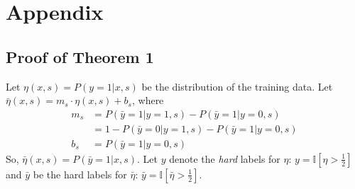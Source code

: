 
\section{Appendix}
\subsection{Proof of Theorem 1}
Let $\eta(x,s)=P(y=1|x,s)$ be the distribution of the training data.
Let $\bar{\eta}(x, s)=m_s\cdot\eta(x,s)+b_s$, where
\begin{align}
  m_s&=P(\bar{y}=1|y=1,s)-P(\bar{y}=1|y=0,s)\nonumber\\
  &=1-P(\bar{y}=0|y=1,s)-P(\bar{y}=1|y=0,s)\\
  b_s&=P(\bar{y}=1|y=0,s)
\end{align}
So, $\bar{\eta}(x, s)=P(\bar{y}=1|x, s)$.
Let $y$ denote the \emph{hard} labels for $\eta$: $y=\mathbb{I}\left[\eta>\tfrac{1}{2}\right]$ and $\bar{y}$ be the hard labels for $\bar{\eta}$: $\bar{y}=\mathbb{I}\left[\bar{\eta}>\tfrac{1}{2}\right]$.

